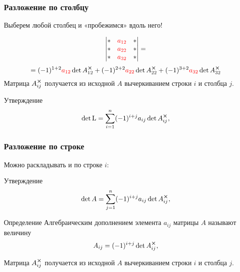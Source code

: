 \begin{frame}
    \frametitle{Разложение по столбцу}

    Выберем любой столбец и «пробежимся» вдоль него!

    \[
        \begin{vmatrix}
            * & \textcolor{red}{a_{12}} & * \\
            * & \textcolor{red}{a_{22}} & * \\
            * & \textcolor{red}{a_{32}} & * \\
        \end{vmatrix}  =      
    \]
    \[ 
       =(-1)^{1+2} \textcolor{red}{a_{12}} \det A_{12}^{\cross} +
        (-1)^{2+2} \textcolor{red}{a_{22}} \det A_{22}^{\cross} +
        (-1)^{3+2} \textcolor{red}{a_{32}} \det A_{32}^{\cross}
    \]
    Матрица $A_{ij}^{\cross}$ получается из исходной $A$ вычеркиванием строки $i$ и
    столбца $j$.
    \pause
    \begin{block}{Утверждение}       
    \[
    \det \operatorname{L} = \sum_{i=1}^{n} (-1)^{i+j} a_{ij} \det A_{ij}^{\cross},
    \]
    \end{block}

    
\end{frame}


\begin{frame}
    \frametitle{Разложение по строке}

    Можно раскладывать и по строке $i$:
\begin{block}{Утверждение}
\[
\det A = \sum_{j=1}^{n} (-1)^{i+j} a_{ij} \det A_{ij}^{\cross},
\]
\end{block}

    \begin{block}{Определение}
        \alert{Алгебраическим дополнением} элемента $a_{ij}$ матрицы $A$ называют величину
        \[
        A_{ij} = (-1)^{i+j} \det A_{ij}^{\cross},    
        \]
    \end{block}

    Матрица $A_{ij}^{\cross}$ получается из исходной $A$ вычеркиванием строки $i$ и
    столбца $j$.

\end{frame}